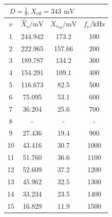 \documentclass[a4paper, 12pt]{article}
\begin{document}
\begin{center}
        \bgroup
        \def\arraystretch{1.6180339887498948}
          \begin{tabular}{@{}cccc@{}}
          \toprule
          \multicolumn{3}{c}{$D = \frac{1}{8}, X_{\text{eff}} = 343 \,\ \si{\milli\volt}$} \\ \midrule
          $\nu$      & $\hat{X}_\nu / \si{\milli\volt}$   & $X_{\nu_{\text{eff}}} / \si{\milli\volt}$ & $f_\nu / \si{\kilo\hertz}$ \\ \hline
          1  & 244.942     & 173.2      & 100      \\
          2  & 222.965     & 157.66     & 200      \\
          3  & 189.787     & 134.2      & 300      \\
          4  & 154.291     & 109.1      & 400      \\
          5  & 116.673     & 82.5       & 500      \\
          6  & 75.095      & 53.1       & 600      \\
          7  & 36.204      & 25.6       & 700      \\
          8  &  -           & -           & -         \\
          9  & 27.436      & 19.4       & 900      \\
          10 & 43.416      & 30.7       & 1000     \\
          11 & 51.760      & 36.6       & 1100     \\
          12 & 52.609      & 37.2       & 1200     \\
          13 & 45.962      & 32.5       & 1300     \\
          14 & 33.234      & 23.5       & 1400     \\
          15 & 16.829      & 11.9       & 1500     \\ \bottomrule
          \end{tabular}
          \egroup
    \end{center}
\end{document}
